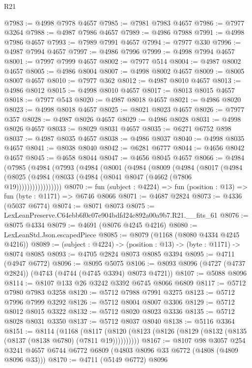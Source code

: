 \begin{lexlean}{R21}
\begin{coremodule}
@7983 := @4998 @7978 @4657
@7985 := @7981 @7983 @4657
@7986 := @7977 @3264
@7988 := @4987 @7986 @4657
@7989 := @4986 @7988
@7991 := @4998 @7986 @4657
@7993 := @7989 @7991 @4657
@7994 := @7977 @330
@7996 := @4987 @7994 @4657
@7997 := @4986 @7996
@7999 := @4998 @7994 @4657
@8001 := @7997 @7999 @4657
@8002 := @7977 @514
@8004 := @4987 @8002 @4657
@8005 := @4986 @8004
@8007 := @4998 @8002 @4657
@8009 := @8005 @8007 @4657
@8010 := @7977 @362
@8012 := @4987 @8010 @4657
@8013 := @4986 @8012
@8015 := @4998 @8010 @4657
@8017 := @8013 @8015 @4657
@8018 := @7977 @543
@8020 := @4987 @8018 @4657
@8021 := @4986 @8020
@8023 := @4998 @8018 @4657
@8025 := @8021 @8023 @4657
@8026 := @7977 @357
@8028 := @4987 @8026 @4657
@8029 := @4986 @8028
@8031 := @4998 @8026 @4657
@8033 := @8029 @8031 @4657
@8035 := @6271 @6752 @898
@8037 := @4987 @8035 @4657
@8038 := @4986 @8037
@8040 := @4998 @8035 @4657
@8041 := @8038 @8040
@8042 := @6281 @6777
@8044 := @4656 @8042 @4657
@8045 := @4658 @8044
@8047 := @4656 @8045 @4657
@8066 := @4984
    (@7985
      (@4984
        (@7993
          (@4984
            (@8001
              (@4984
                (@8009
                  (@4984
                    (@8017
                      (@4984
                        (@8025 (@4984 (@8033 (@4984 (@8041 @8047 (@4662 (@7806 @19)))))))))))))))))
@8070 := fun (subject : @4224) => fun (position : @13) => fun (byte : @1171) => @6746 @8066
@8071 := @4687 @2824
@8073 := @4336 (@5037 @6774)
@8074 := @8071 @8073
@8075 := LexLeanPreserve.C64ebb6f0c07e904bdfd24c892a00a9b7.R21.__fits_61
@8076 := @8075 @4334
@8079 := @4691 (@8076 @4245 @4216)
@8080 := LexLeanStd.Json.escapedPiece
@8085 := @8079 (@1168 (@8080 @4334 @4245 @4216))
@8089 := (subject : @4224) -> (position : @13) -> (byte : @1171) -> @8074 @8085
@8093 := @4705 @2824 @8073 @8085 @3394
@8095 := @4711 (@4947 @6772)
@8096 := @8095 @5075
@8106 := @8093 @8096 (@4727 (@4737 @2824)) (@4743 (@4744 (@4745 @3394) @8073 @4721))
@8107 := @5088 @8096
@8114 := @8107 @133 @26 @3242 @3392 @6745 @8066 @6809
@8117 := @5712 @7980 @7983 @3258
@8120 := @5712 @7988 @7991 @3275
@8123 := @5712 @7996 @7999 @3292
@8126 := @5712 @8004 @8007 @3306
@8129 := @5712 @8012 @8015 @3322
@8132 := @5712 @8020 @8023 @3336
@8135 := @5712 @8028 @8031 @3350
@8137 := @5712 @8037 @8040
@8138 := @5116 @3364
@8151 := @8114
    (@1168
      (@8117 (@8120 (@8123 (@8126 (@8129 (@8132 (@8135 (@8137 (@8138 @6780) (@7811 @19))))))))))
@8167 := @8107
    @98
    @3057
    @254
    @3241
    @4657
    @6744
    @6772
    @6809
    (@4803 @8096 @33 @6772 (@4808 (@4809 @8096 @33)))
@8170 := @4711 (@5149 @6772) @8096

\end{coremodule}
\end{lexlean}

